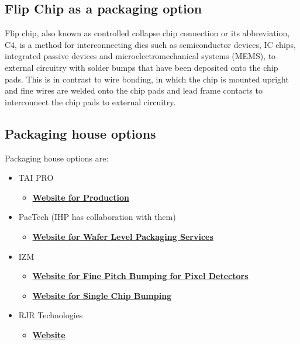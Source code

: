 \documentclass{article}
\begin{document}
\subsection{Flip Chip as a packaging option}

Flip chip, also known as controlled collapse chip connection or its abbreviation, C4, is a method for interconnecting dies such as semiconductor devices, IC chips, integrated passive devices and microelectromechanical systems (MEMS), to external circuitry with solder bumps that have been deposited onto the chip pads. This is in contrast to wire bonding, in which the chip is mounted upright and fine wires are welded onto the chip pads and lead frame contacts to interconnect the chip pads to external circuitry.


\subsection{Packaging house options}

Packaging house options are:

\begin{itemize}
	\item TAI PRO
	\begin{itemize}
		\item \href{https://www.taipro.be/production}{\textbf{Website for Production}}
	\end{itemize}
	\item PacTech (IHP has collaboration with them)
	\begin{itemize}
		\item \href{https://pactech.com/wafer-level-packaging-services/}{\textbf{Website for Wafer Level Packaging Services}}
	\end{itemize}
	\item IZM
	\begin{itemize}
		\item \href{https://www.izm.fraunhofer.de/en/abteilungen/wafer-level-system-integration/leistungsangebot/fine-pitch-bumping-for-pixel-detectors.html}{\textbf{Website for Fine Pitch Bumping for Pixel Detectors}}
		\item \href{https://www.izm.fraunhofer.de/en/abteilungen/wafer-level-system-integration/leistungsangebot/single_chip_bumping.html}{\textbf{Website for Single Chip Bumping}}
	\end{itemize}
	\item RJR Technologies
	\begin{itemize}
		\item \href{https://www.rjrtechnologies.com/}{\textbf{Website}}
	\end{itemize}
\end{itemize}
\end{document}

